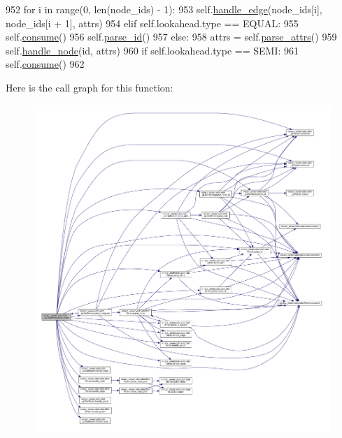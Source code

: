\begin{DoxyCode}
952                 \textcolor{keywordflow}{for} i \textcolor{keywordflow}{in} range(0, len(node\_ids) - 1):
953                     self.\hyperlink{classsmacc__viewer_1_1xdot_1_1xdot__qt_1_1DotParser_a04742e209550b8c2972d4ea199edfa76}{handle\_edge}(node\_ids[i], node\_ids[i + 1], attrs)
954             \textcolor{keywordflow}{elif} self.lookahead.type == EQUAL:
955                 self.\hyperlink{classsmacc__viewer_1_1xdot_1_1xdot__qt_1_1Parser_aba6f69f48f1d4e25b13e4cb297f509e6}{consume}()
956                 self.\hyperlink{classsmacc__viewer_1_1xdot_1_1xdot__qt_1_1DotParser_a7ed529e7510bac45a0df282195f3dfea}{parse\_id}()
957             \textcolor{keywordflow}{else}:
958                 attrs = self.\hyperlink{classsmacc__viewer_1_1xdot_1_1xdot__qt_1_1DotParser_af1efca86cd85a355e09fa7456b25c139}{parse\_attrs}()
959                 self.\hyperlink{classsmacc__viewer_1_1xdot_1_1xdot__qt_1_1DotParser_a5e6de9a2df0e6c137311a42257d7f266}{handle\_node}(id, attrs)
960         \textcolor{keywordflow}{if} self.lookahead.type == SEMI:
961             self.\hyperlink{classsmacc__viewer_1_1xdot_1_1xdot__qt_1_1Parser_aba6f69f48f1d4e25b13e4cb297f509e6}{consume}()
962 
\end{DoxyCode}


Here is the call graph for this function\+:
\nopagebreak
\begin{figure}[H]
\begin{center}
\leavevmode
\includegraphics[width=350pt]{classsmacc__viewer_1_1xdot_1_1xdot__qt_1_1DotParser_aab4ab0bb958d2ff8e7f35ce9828eff88_cgraph}
\end{center}
\end{figure}




